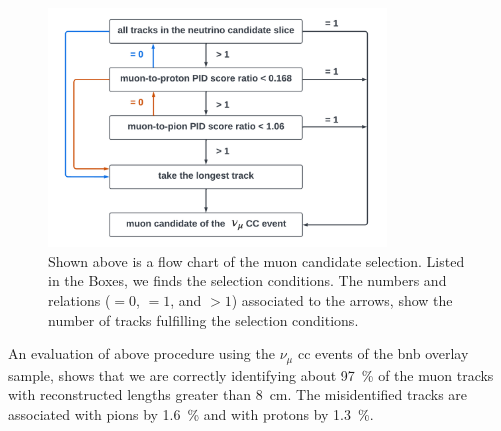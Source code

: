 \begin{figure}[htbp]
  \centering
  \includegraphics[width=0.8\textwidth]{images/NewCCInclusive/selection/muon_candidate_flow_chart.pdf}
  \caption[Moun Candidate Selection Flow Chart]{Shown above is a flow chart of the muon candidate selection. Listed in the Boxes, we finds the selection conditions. The numbers and relations ($=0$, $=1$, and $>1$) associated to the arrows, show the number of tracks fulfilling the selection conditions.}
  \label{fig:muon_candidate}
\end{figure}
An evaluation of above procedure using the $\nu_\mu$ \gls{cc} events of the \gls{bnb} overlay sample, shows that we are correctly identifying about \SI{97}{\percent} of the muon tracks with reconstructed lengths greater than \SI{8}{\centi\metre}. The misidentified tracks are associated with pions by \SI{1.6}{\percent} and with protons by \SI{1.3}{\percent}.


